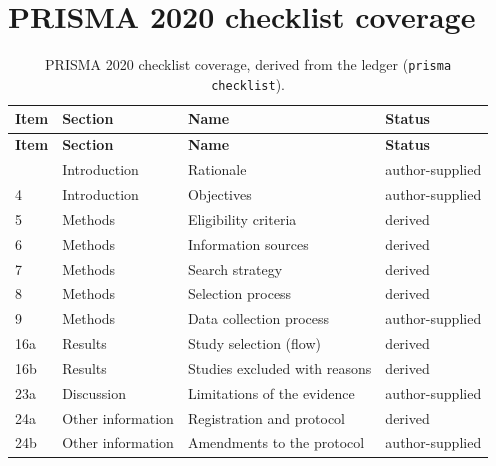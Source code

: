 \documentclass[12pt,a4paper]{article}
\begin{document}
\section{PRISMA 2020 checklist coverage}
\label{app:checklist}
\begin{longtable}{@{}l l l l@{}}
\caption{PRISMA 2020 checklist coverage, derived from the ledger (\texttt{prisma checklist}).}
\label{tab:checklist} \\
\toprule
\textbf{Item} & \textbf{Section} & \textbf{Name} & \textbf{Status} \\
\midrule
\endfirsthead
\toprule
\textbf{Item} & \textbf{Section} & \textbf{Name} & \textbf{Status} \\
\midrule
\endhead
\bottomrule
\endfoot
3   & Introduction      & Rationale                    & author-supplied \\
4   & Introduction      & Objectives                   & author-supplied \\
5   & Methods           & Eligibility criteria         & derived \\
6   & Methods           & Information sources          & derived \\
7   & Methods           & Search strategy              & derived \\
8   & Methods           & Selection process            & derived \\
9   & Methods           & Data collection process      & author-supplied \\
16a & Results           & Study selection (flow)       & derived \\
16b & Results           & Studies excluded with reasons & derived \\
23a & Discussion        & Limitations of the evidence  & author-supplied \\
24a & Other information & Registration and protocol    & derived \\
24b & Other information & Amendments to the protocol   & author-supplied \\
\end{longtable}



\end{document}
